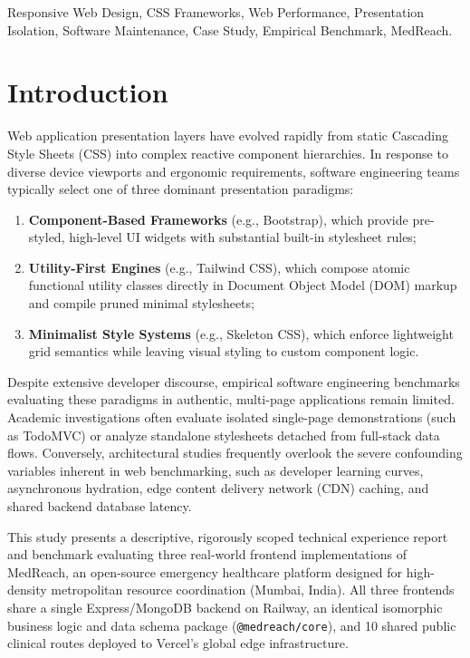 \documentclass[conference]{IEEEtran}
\begin{document}
\begin{IEEEkeywords}
Responsive Web Design, CSS Frameworks, Web Performance, Presentation Isolation, Software Maintenance, Case Study, Empirical Benchmark, MedReach.
\end{IEEEkeywords}

\section{Introduction}
Web application presentation layers have evolved rapidly from static Cascading Style Sheets (CSS) into complex reactive component hierarchies. In response to diverse device viewports and ergonomic requirements, software engineering teams typically select one of three dominant presentation paradigms:
\begin{enumerate}
    \item \textbf{Component-Based Frameworks} (e.g., Bootstrap), which provide pre-styled, high-level UI widgets with substantial built-in stylesheet rules;
    \item \textbf{Utility-First Engines} (e.g., Tailwind CSS), which compose atomic functional utility classes directly in Document Object Model (DOM) markup and compile pruned minimal stylesheets;
    \item \textbf{Minimalist Style Systems} (e.g., Skeleton CSS), which enforce lightweight grid semantics while leaving visual styling to custom component logic.
\end{enumerate}

Despite extensive developer discourse, empirical software engineering benchmarks evaluating these paradigms in authentic, multi-page applications remain limited. Academic investigations often evaluate isolated single-page demonstrations (such as TodoMVC) or analyze standalone stylesheets detached from full-stack data flows. Conversely, architectural studies frequently overlook the severe confounding variables inherent in web benchmarking, such as developer learning curves, asynchronous hydration, edge content delivery network (CDN) caching, and shared backend database latency.

This study presents a descriptive, rigorously scoped technical experience report and benchmark evaluating three real-world frontend implementations of MedReach, an open-source emergency healthcare platform designed for high-density metropolitan resource coordination (Mumbai, India). All three frontends share a single Express/MongoDB backend on Railway, an identical isomorphic business logic and data schema package (\texttt{@medreach/core}), and 10 shared public clinical routes deployed to Vercel's global edge infrastructure.
\end{document}
